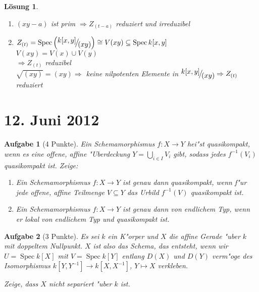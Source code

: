 \documentclass[paper = A4, fontsize=12pt, numbers=noendperiod, chapterprefix=true]{scrbook}
\theoremstyle{break}
\newtheorem{Aufg}{Aufgabe}
\newtheorem{Loes}{L\"osung}
\theoremstyle{nonumberbreak}
\theoremstyle{nonumberplain}
\DeclareMathOperator{\Spec}{Spec}
\newcommand{\FakRaum}[2]{
	\raisebox{0.7ex}{\ensuremath{#1}}
	\ensuremath{\mkern-3mu}\big/\ensuremath{\mkern-3mu}
	\raisebox{-0.6ex}{\ensuremath{#2}}}
\begin{document}
\begin{Loes}
\begin{enumerate}[a)]
	\begin{enumerate}[\underline{$a=0$}:]
	\item[\underline{$a \ne 0$}:]
		$(xy-a)$ ist prim $\Rightarrow Z_{(t-a)}$ reduziert und irreduzibel
	\item[\underline{$a = 0$}:]
		$Z_{(t)} = \Spec \left( \FakRaum{k[x,y]}{(xy)} \right) \cong V(xy) \subseteq \Spec k[x,y]$\\
		$V(xy) = V(x) \cup V(y)$\\
		$\Rightarrow Z_{(t)}$ reduzibel\\
		$\sqrt{(xy)} = (xy) \Rightarrow$ keine nilpotenten Elemente in $\FakRaum{k[x,y]}{(xy)} \Rightarrow Z_{(t)}$ reduziert
	\end{enumerate}
\end{enumerate}\end{Loes}

\newpage
\section{12. Juni 2012}
\setcounter{Aufg}{0}
\setcounter{Loes}{0}

\begin{Aufg}[4 Punkte]
Ein Schemamorphismus $f \colon X \to Y$ hei"st {\em quasikompakt}, wenn es eine offene, affine "Uberdeckung $Y = \bigcup\limits_{i \in I} V_i$ gibt, sodass jedes $f^{-1}(V_i)$ quasikompakt ist. Zeige:
\begin{enumerate}%
\item Ein Schemamorphismus $f \colon X \to Y$ ist genau dann quasikompakt, wenn f"ur jede offene, affine Teilmenge $V \subseteq Y$ das Urbild $f^{-1}(V)$ quasikompakt ist.
\item Ein Schemamorphismus $f \colon X \to Y$ ist genau dann von endlichem Typ, wenn er lokal von endlichem Typ und quasikompakt ist.
\end{enumerate}
\end{Aufg}

\begin{Aufg}[3 Punkte]
Es sei $k$ ein K"orper und $X$ die affine Gerade "uber $k$ mit doppeltem Nullpunkt. $X$ ist also das Schema, das entsteht, wenn wir $U = \Spec k[X]$ mit $V = \Spec k[Y]$ entlang $D(X)$ und $D(Y)$ verm"oge des Isomorphismus $k[Y,Y^{-1}] \to k[X,X^{-1}]$, $Y\mapsto X$ verkleben.

Zeige, dass $X$ nicht separiert "uber $k$ ist.
\end{Aufg}
\end{document}
